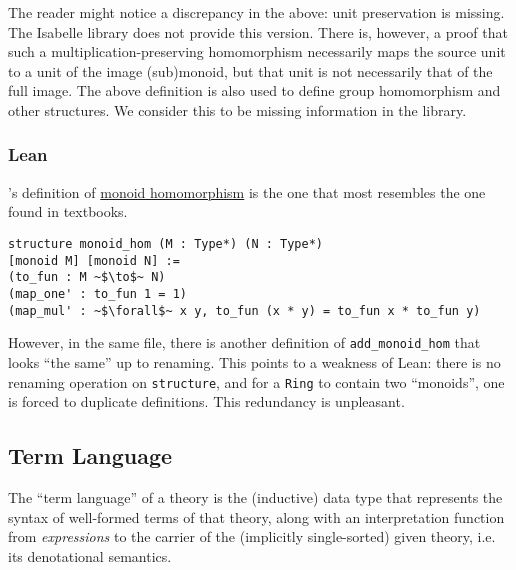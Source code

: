 The reader might notice a discrepancy in the above: unit preservation is
missing.  The Isabelle library does not provide this version.
There is, however, a proof that such a multiplication-preserving homomorphism
necessarily maps the source unit to a unit of the image (sub)monoid, but that
unit is not necessarily that of the full image. The above definition is also
used to define group homomorphism and other structures. We consider
this to be missing information in the library. 


\subsubsection{Lean}\hspace{-0.4em}'s
definition of \href{https://github.com/leanprover-community/mathlib/blob/3c58f160fd51ebf989138ed7c8981f821f08f860/src/algebra/group/hom.lean}
{monoid homomorphism}
is the one that most resembles the one found in textbooks. 
\begin{verbatim}
structure monoid_hom (M : Type*) (N : Type*) 
[monoid M] [monoid N] :=
(to_fun : M ~$\to$~ N)
(map_one' : to_fun 1 = 1)
(map_mul' : ~$\forall$~ x y, to_fun (x * y) = to_fun x * to_fun y)
\end{verbatim}

However, in the same file, there is another definition of \verb|add_monoid_hom| that looks ``the same'' up to renaming. This points
to a weakness of Lean: there is no renaming operation on 
\verb|structure|, and for a \verb|Ring| to contain two ``monoids'', one
is forced to duplicate definitions. This redundancy is unpleasant.

\subsection{Term Language}

The ``term language'' of a theory is the (inductive) data type
that represents the syntax of well-formed terms of that theory,
along with an interpretation function from \emph{expressions} 
to the carrier of the (implicitly single-sorted) given theory, i.e.
its denotational semantics.

